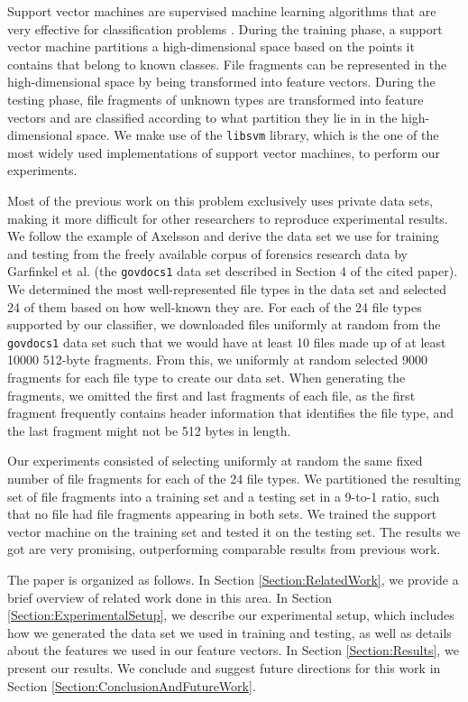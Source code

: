 \documentclass[5p]{elsarticle}
\begin{document}
Support vector machines are supervised machine learning algorithms that are very effective for classification problems \cite{Li10}. During the training phase, a support vector machine partitions a high-dimensional space based on the points it contains that belong to known classes. File fragments can be represented in the high-dimensional space by being transformed into feature vectors. During the testing phase, file fragments of unknown types are transformed into feature vectors and are classified according to what partition they lie in in the high-dimensional space. We make use of the \texttt{libsvm} \cite{CC01a} library, which is the one of the most widely used implementations of support vector machines, to perform our experiments.

Most of the previous work on this problem exclusively uses private data sets, making it more difficult for other researchers to reproduce experimental results. We follow the example of Axelsson \cite{Axelsson10} and derive the data set we use for training and testing from the freely available corpus of forensics research data by Garfinkel et al. \cite{Garfinkel09} (the \texttt{govdocs1} data set described in Section 4 of the cited paper). We determined the most well-represented file types in the data set and selected 24 of them based on how well-known they are. For each of the 24 file types supported by our classifier, we downloaded files uniformly at random from the \texttt{govdocs1} data set such that we would have at least 10 files made up of at least 10000 512-byte fragments. From this, we uniformly at random selected 9000 fragments for each file type to create our data set. When generating the fragments, we omitted the first and last fragments of each file, as the first fragment frequently contains header information that identifies the file type, and the last fragment might not be 512 bytes in length.

Our experiments consisted of selecting uniformly at random the same fixed number of file fragments for each of the 24 file types. We partitioned the resulting set of file fragments into a training set and a testing set in a 9-to-1 ratio, such that no file had file fragments appearing in both sets. We trained the support vector machine on the training set and tested it on the testing set. The results we got are very promising, outperforming comparable results from previous work.

The paper is organized as follows. In Section \ref{Section:RelatedWork}, we provide a brief overview of related work done in this area. In Section \ref{Section:ExperimentalSetup}, we describe our experimental setup, which includes how we generated the data set we used in training and testing, as well as details about the features we used in our feature vectors. In Section \ref{Section:Results}, we present our results. We conclude and suggest future directions for this work in Section \ref{Section:ConclusionAndFutureWork}.
\end{document}
